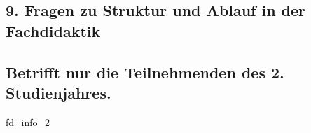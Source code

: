 \documentclass[a4paper,10pt]{article}
\makeatletter
\def\saveenum{\xdef\@savedenum{\the\c@enumi\relax}}
\makeatother
\begin{document}
{\begin{enumerate}
\end{enumerate} \saveenum

\vspace{-1cm}


\pagebreak



\subsection*{9. Fragen zu Struktur und Ablauf in der Fachdidaktik \\ \\
\small{Betrifft nur die Teilnehmenden des 2. Studienjahres.}}

\vspace{1cm}

\begin{questionmult}{fd_info_2}
	\begin{choices}
	\end{choices}
\end{questionmult}

\vspace{-1cm}


 \\

\begin{enumerate}


\end{enumerate}}
\end{document}
